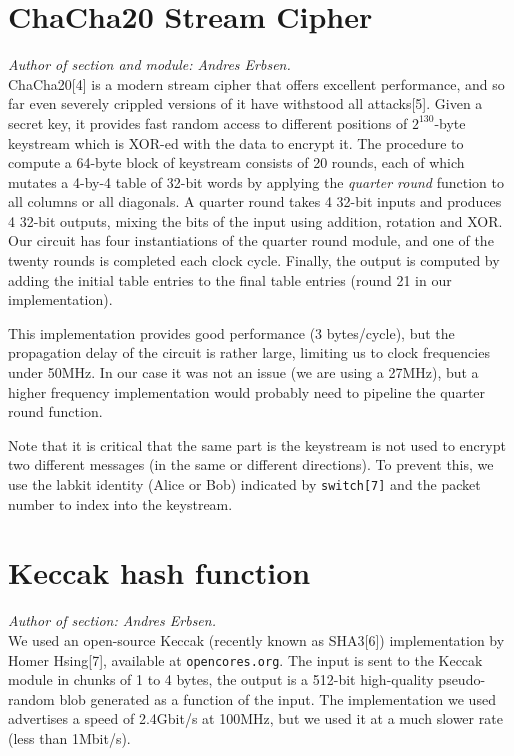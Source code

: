 \section{ChaCha20 Stream Cipher}\label{chacha20-stream-cipher}

\emph{Author of section and module: Andres Erbsen.}\\ChaCha20{[}4{]} is
a modern stream cipher that offers excellent performance, and so far
even severely crippled versions of it have withstood all attacks{[}5{]}.
Given a secret key, it provides fast random access to different
positions of \(2^{130}\)-byte keystream which is XOR-ed with the data to
encrypt it. The procedure to compute a 64-byte block of keystream
consists of 20 rounds, each of which mutates a 4-by-4 table of 32-bit
words by applying the \emph{quarter round} function to all columns or
all diagonals. A quarter round takes 4 32-bit inputs and produces 4
32-bit outputs, mixing the bits of the input using addition, rotation
and XOR. Our circuit has four instantiations of the quarter round
module, and one of the twenty rounds is completed each clock cycle.
Finally, the output is computed by adding the initial table entries to
the final table entries (round 21 in our implementation).

This implementation provides good performance (3 bytes/cycle), but the
propagation delay of the circuit is rather large, limiting us to clock
frequencies under 50MHz. In our case it was not an issue (we are using a
27MHz), but a higher frequency implementation would probably need to
pipeline the quarter round function.

Note that it is critical that the same part is the keystream is not used
to encrypt two different messages (in the same or different directions).
To prevent this, we use the labkit identity (Alice or Bob) indicated by
\texttt{switch{[}7{]}} and the packet number to index into the
keystream.

\section{Keccak hash function}\label{keccak-hash-function}

\emph{Author of section: Andres Erbsen.}\\We used an open-source Keccak
(recently known as SHA3{[}6{]}) implementation by Homer Hsing{[}7{]},
available at \texttt{opencores.org}. The input is sent to the Keccak
module in chunks of 1 to 4 bytes, the output is a 512-bit high-quality
pseudo-random blob generated as a function of the input. The
implementation we used advertises a speed of 2.4Gbit/s at 100MHz, but we
used it at a much slower rate (less than 1Mbit/s).
